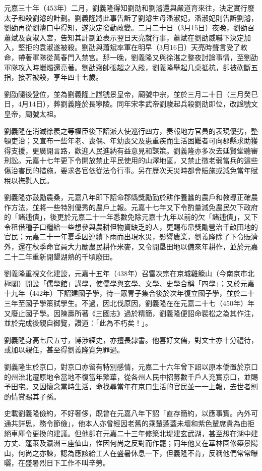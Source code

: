 元嘉三十年（453年）二月，劉義隆得知劉劭和劉濬還與嚴道育來往，決定實行廢太子和殺劉濬的計劃。劉義隆將此事告訴了劉濬生母潘淑妃，潘淑妃則告訴劉濬，劉劭再從劉濬口中得知，遂決定發動政變。二月二十日（3月15日）夜晚，劉劭召蕭斌及袁淑入宮，告知其計劃並表示翌日天亮就行事，蕭斌在劉劭威嚇下決定加入，堅拒的袁淑遂被殺。劉劭與蕭斌率軍在明早（3月16日）天亮時聲言受了敕命，帶著軍隊從萬春門入禁宮。那一晚，劉義隆又與徐湛之整夜討論事情，至劉劭軍隊攻入時蠟燭還亮著。劉劭齋帥張超之入殿，劉義隆舉起几桌抵抗，卻被砍斷五指，接著被殺，享年四十七歲。

劉劭隨後登位，並為劉義隆上諡號景皇帝，廟號中宗，並於三月二十日（三月癸巳日，4月14日），葬劉義隆於長寧陵。同年宋孝武帝劉駿起兵殺劉劭即位，改諡號文皇帝，廟號太祖。

劉義隆在消滅徐羨之等權臣後下詔派大使巡行四方，奏報地方官員的表現優劣，整頓吏治；又宣布一些年老、喪偶、年幼喪父及患重疾而生活困難者可向郡縣求助獲得支援，更廣開言路，歡迎人民進納有益意見和謀策。劉義隆亦多次去延賢堂聽審刑訟。元嘉十七年更下令開放禁止平民使用的山澤地區，又禁止徵老弱當兵的這些傷治害民的措施，要求各官依從法令行事。另在歷次天災時都會賑施或減免當年賦稅以撫慰人民。

劉義隆亦鼓勵農桑，元嘉八年即下詔命郡縣獎勵勤於耕作養蠶的農戶和教導正確農作方法，並將一些特別優秀的農戶上報。元嘉十七年又下令酌量減免農民欠下政府的「諸逋債」，後更於元嘉二十一年悉數免除元嘉十九年以前的欠「諸逋債」，又下令租借種子口糧給一些想參與農耕但物資缺乏的人，更賜布帛獎勵營治千畝田地的官民；元嘉二十一年夏季因連續下雨而出現水災，影響農業，劉義隆除了下令賑濟外，還在秋季命官員大力勵農民耕作米麥，又令開垦田地以備來年耕作，並於元嘉二十二年重新開墾湖熟的千頃廢田。

劉義隆重視文化建設，元嘉十五年（438年）召雷次宗在京城雞籠山（今南京市北極閣）開設「儒學館」講學，使儒學與玄學、文學、史學合稱「四學」；又於元嘉十九年（442年）下詔建國子學，待一眾冑子集合後於次年復立國子學，並於二十三年至國子學策試學生。不過，因北伐原因，劉義隆在在元嘉二十七（450年）年又廢止國子學。因陳壽所著《三國志》過於精簡，劉義隆便詔命裴松之為其作注，並於完成後親自御覽，讚道：「此為不朽矣！」。

劉義隆身高七尺五寸，博涉經史，亦擅長隸書。他喜好文儒，對文士亦十分禮待，或加以親任，甚至得劉義隆寛免罪過。

劉義隆生於京口，對京口亦留有特別感情，元嘉二十六年曾下詔以原本僑置於京口的州治北遷原地令當地不復當年繁華，從各州人民中招募數千戶人充實京口，並賜予田宅。又因懷念當時生活，命找尋當年在京口生活的官民並一一上報，去世者則酌情賞賜其子孫。

史載劉義隆儉約，不好奢侈，既曾在元嘉八年下詔「直存簡約，以應事實。內外可通共詳思，務令節儉」，他本人亦曾經因老舊的乘輦蓬蓋未壞和紫色輦席貴為由拒絕車庫令更換的建議。但他卻在元嘉二十三年修築北堤建玄武湖，甚至想在湖中建方丈、蓬萊及瀛洲三座仙山，惟因何尚之反對而作罷；同年他又在華林園修築景陽山，何尚之亦諫，認為應該給工人在盛暑休息一下，但義隆不肯，反稱他們常常曝曬，在盛暑烈日下工作不叫辛勞。

